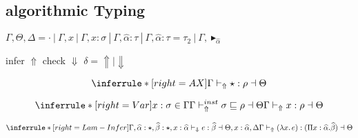 \newcommand{\tpmapsto}[3]{#2\mapsto#3}
\newcommand{\castupe}{\ensuremath{\mathsf{cast}^{\uparrow}\ }}
\newcommand{\castdowne}{\ensuremath{\mathsf{cast}^{\downarrow}\ }}
\newcommand{\judge}{\Gamma\vdash}
\newcommand{\forallvars}[1]{\forall \overbar{#1}}
\newcommand{\olpolymorphic}[2]{\vdash^{ol} #1 \sqsubseteq #2}

\gram{\otte\ottinterrule}

\gram{\ottR\ottinterrule}

\gram{\ottt\ottinterrule}

\subsection{algorithmic Typing}

\newcommand{\checktype}{\Gamma\vdash_\Downarrow}
\newcommand{\infertype}{\Gamma\vdash_\Uparrow}
\newcommand{\infercheck}{\Gamma\vdash_\delta}

\newcommand{\checktypeno}{\vdash_\Downarrow}
\newcommand{\infertypeno}{\vdash_\Uparrow}
\newcommand{\infercheckno}{\vdash_\delta}

\newcommand{\instinfer}{\vdash^{inst}_\Uparrow}
\newcommand{\instcheck}{\vdash^{inst}_\Downarrow}
\newcommand{\instinfercheck}{\vdash^{inst}_\delta}

\newcommand{\polyinfer}{\Gamma\vdash^{poly}_\Uparrow}
\newcommand{\polycheck}{\Gamma\vdash^{poly}_\Downarrow}
\newcommand{\polycheckno}{\vdash^{poly}_\Downarrow}
\newcommand{\polyinfercheck}{\vdash^{poly}_\delta}

\newcommand{\dsk}{\vdash^{dsk}}
\newcommand{\unify}{\vdash^{unify}}

\newcommand{\genvar}{\widehat}
\newcommand{\genA}{\genvar{\alpha}}
\newcommand{\genB}{\genvar{\beta}}


$\Gamma, \Theta, \Delta  = \cdot~|~\Gamma, x~|~\Gamma, x:\sigma~|~\Gamma, \genA:\tau~|~\Gamma, \genA:\tau = \tau_2~|~\Gamma, \blacktriangleright_{\genA}$

\framebox{$ \infercheck e : \rho \dashv \Theta $ } infer $\Uparrow$ check $\Downarrow$ $\delta = \Uparrow \mid \Downarrow$

\[
\inferrule*[right=AX]
{ }
{\infertype \star : \rho \dashv \Theta}
\]

\[
\inferrule*[right=Var]
{x:\sigma \in \Gamma \\ \Gamma \instinfer \sigma \sqsubseteq \rho \dashv \Theta }
{\infertype x : \rho \dashv \Theta}
\]

\[
\inferrule*[right=Lam-Infer]
{\Gamma, \genA:\star, \genB:\star, x: \genA \checktypeno e : \genB \dashv \Theta, x:\genA , \Delta}
{\infertype (\lambda x.\, e) : (\Pi x: \genA. \genB) \dashv \Theta}
\]

